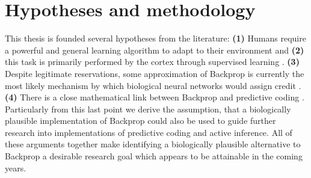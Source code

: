 \section{Hypotheses and methodology}

This thesis is founded several hypotheses from the literature: \textbf{(1)} Humans require a powerful and general
learning algorithm to adapt to their environment \citep{Bartunov2018} and \textbf{(2)} this task is primarily performed
by the cortex through supervised learning \citep{Marblestone2016}. \textbf{(3)} Despite legitimate reservations, some
approximation of Backprop is currently the most likely mechanism by which biological neural networks would assign credit
\citep{whittington2019theories}. \textbf{(4)} There is a close mathematical link between Backprop and predictive coding
\citep{millidge2021predictive}. Particularly from this last point we derive the assumption, that a biologically
plausible implementation of Backprop could also be used to guide further research into implementations of predictive
coding and active inference. All of these arguments together make identifying a biologically plausible alternative to
Backprop a desirable research goal which appears to be attainable in the coming years.


